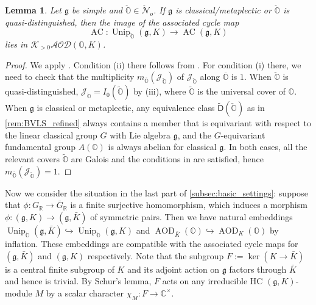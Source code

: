 \documentclass[11pt, a4paper]{amsart}
\newcommand{\C}{\mathbb{C}}
\newcommand{\J}{\mathcal{J}}
\newcommand{\g}{\mathfrak{g}}
\newcommand{\orb}{\mathbb{O}}
\newcommand{\fg}{\mathfrak{g}}
\newcommand{\ckorb}{\check{\orb}}
\newcommand{\cK}{\mathcal{K}}
\newcommand{\cN}{\mathcal{N}}
\DeclareMathOperator{\AC}{AC}
\DeclareMathOperator{\AOD}{AOD}
\DeclareMathOperator{\Unip}{Unip}
\newcommand{\AODK}{\AOD_K}
\newcommand{\cAOD}{\mathcal{AOD}}
\newcommand{\UnipOv}{\Unip_{\ckorb}}
\newcommand{\R}{\mathbb{R}}
\newcommand{\cm}{\C^\times}
\newcommand{\GR}{G_\R}
\newtheorem{Lem}[Thm]{Lemma}
\theoremstyle{definition}
\newtheorem{Rem}[Thm]{Remark}
\numberwithin{equation}{section}
\begin{document}
\begin{Lem}\label{lem:AC_special_unip}
	Let $\g$ be simple and $\ckorb \in \check{\cN}_o$. If $\g$ is classical/metaplectic or $\ckorb$ is quasi-distinguished, then the image of the associated cycle map
		\[ \AC: \UnipOv(\g, K) \xrightarrow{\ \ } \AC(\g,K) \]
	lies in $\cK_{>0}\cAOD(\orb, K)$.
\end{Lem}

\begin{proof}
	We apply \cite[Theorem 8.7]{Vogan_AV}. Condition (ii) there follows from . For condition (i) there, we need to check that the multiplicity $m_{\overline{\orb}}(\J_{\ckorb})$ of $\J_{\ckorb}$ along $\overline{\orb}$ is $1$. When $\ckorb$ is quasi-distinguished, $\J_{\ckorb} = I_0(\widetilde{\orb})$ by  (iii), where $\widetilde{\orb}$ is the universal cover of $\orb$. When $\g$ is classical or metaplectic, any equivalence class $\widetilde{\mathsf{D}}(\ckorb)$ as in \cref{rem:BVLS_refined} always contains a member that is equivariant with respect to the linear classical group $G$ with Lie algebra $\g$, and the $G$-equivariant fundamental group $A(\orb)$ is always abelian for classical $\fg$. In both cases, all the relevant covers $\widetilde{\orb}$ are Galois and the conditions in \cite[Proposition 6.4 (iii)]{LMBM} are satisfied, hence $m_{\overline{\orb}}(\J_{\ckorb})=1$.
\end{proof}

Now we consider the situation in the last part of \cref{subsec:basic_settings}: suppose that $\phi: \GR \to \bar{G}_\R$ is a finite surjective homomorphism, which induces a morphism $\phi: (\g,K) \to (\g,\bar{K})$ of symmetric pairs.
Then we have natural embeddings $\UnipOv(\g, \bar{K}) \hookrightarrow \UnipOv(\g, K)$ and $\AOD_{\bar{K}}(\orb) \hookrightarrow \AODK(\orb)$ by inflation. These embeddings are compatible with the associated cycle maps for $(\g, \bar{K})$ and $(\g, K)$ respectively. Note that the subgroup $F:=\ker(K \to \bar{K})$ is a central finite subgroup of $K$ and its adjoint action on $\fg$ factors through $\bar{K}$ and hence is trivial. By Schur's lemma, $F$ acts on any irreducible HC $(\g,K)$-module $M$ by a scalar character $\chi_M: F \to \cm$.
\end{document}
